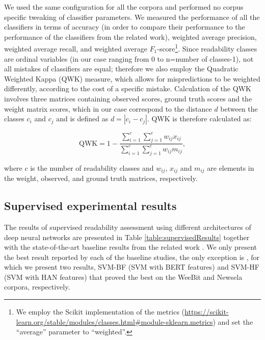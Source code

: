 \documentclass{clv3}
\begin{document}
We used the same configuration for all the corpora and performed no corpus specific tweaking of classifier parameters. We measured the performance of all the classifiers in terms of accuracy (in order to compare their performance to the performance of the classifiers from the related work), weighted average precision, weighted average recall, and weighted average $F_1$-score\footnote{We employ the Scikit implementation of the metrics (\url{https://scikit-learn.org/stable/modules/classes.html\#module-sklearn.metrics}) and set the ``average'' parameter to ``weighted''.}. Since readability classes are ordinal variables (in our case ranging from 0 to n=number of classes-1), not all mistakes of classifiers are equal; therefore we also employ the Quadratic Weighted Kappa (QWK) measure, which allows for mispredictions to be weighted differently, according to the cost of a specific mistake. Calculation of the QWK involves three matrices containing observed scores, ground truth scores and the weight matrix scores, which in our case correspond to the distance $d$ between the classes $c_i$ and $c_j$ and is defined as $d=|c_i-c_j|$. QWK is therefore calculated as:

\begin{equation}
\textrm{QWK} = 1- \frac{\sum_{i=1}^{c} \sum_{j=1}^{c}w_{ij}x_{ij}}{\sum_{i=1}^{c} \sum_{j=1}^{c}w_{ij}m_{ij}},
\label{eq:QWKL}
\end{equation}
\noindent 

\noindent where $c$ is the number of readability classes and $w_{ij}$, $x_{ij}$ and $m_{ij}$ are elements in the weight, observed, and ground truth matrices, respectively.

\subsection{Supervised experimental results}
\label{sec-results-supervised}

The results of supervised readability assessment using different architectures of deep neural networks are presented in Table \ref{table:supervisedResults} together with the state-of-the-art baseline results from the related work \citep{filighera2019automatic, xia2016text, deutsch2020linguistic}. We only present the best result reported by each of the baseline studies, the only exception is \citet{deutsch2020linguistic}, for which we present two results, SVM-BF (SVM with BERT features) and SVM-HF (SVM with HAN features) that proved the best on the WeeBit and Newsela corpora, respectively.
\end{document}
